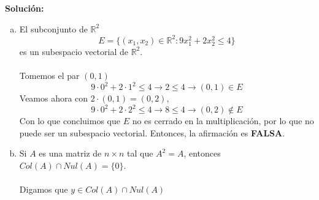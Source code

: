 \documentclass[12pt]{article}
\newenvironment{solucion}
{\begin{mdframed}[backgroundcolor=black!10]
		{\bf Solución:}\\
	}
	{
	\end{mdframed}
}
\newenvironment{preguntas}
{\begin{enumerate}\itemsep12pt
	}
	{
	\end{enumerate}
}
\newcommand{\ra}{\rightarrow}
\newcommand{\R}{\mathbb{R}}
\begin{document}
\begin{preguntas}
\begin{solucion}
\begin{enumerate}[a)]
\item El subconjunto de $\R^2$
			$$E=\{(x_1, x_2) \in \R^2:9x_1^2+2x_2^2 \leq 4\}$$
			es un subespacio vectorial de $\R^2$.\\
			\\
			Tomemos el par $(0,1)$
			$$9 \cdot 0^2 + 2 \cdot 1^2 \leq 4 \ra 2 \leq 4 \ra (0,1) \in E$$
			Veamos ahora con $2 \cdot (0,1) = (0,2)$,
			$$9 \cdot 0^2 + 2 \cdot 2^2 \leq 4 \ra 8 \leq 4 \ra (0,2) \not \in E$$
			Con lo que concluimos que $E$ no es cerrado en la multiplicación, por lo que no puede ser un subespacio vectorial. Entonces, la afirmación es {\bf FALSA}.
\item Si $A$ es una matriz de $n \times n$ tal que $A^2=A$, entonces $Col(A) \cap Nul(A) = \{0\}$.\\
			\\
			Digamos que $y \in Col(A) \cap Nul(A)$
			

\end{enumerate}
\end{solucion}
\end{preguntas}
\end{document}

